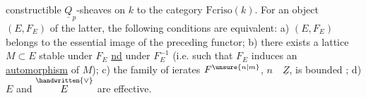 
constructible $\underline{Q}_p$-sheaves on $k$ to the category $\mathrm{Fcriso}(k)$. For an object $(E,F_E)$ of the latter, the following conditions are equivalent: a) $(E,F_E)$ belongs to the essential image of the preceding functor; b) there exists a lattice $M\subset E$ stable under $F_E$  \uline{nd} under $F_E^{-1}$ (i.e. such that $F_E$ induces an \uline{automorphism} of $M$); c) the family of ierates $F^{\unsure{n|m}}$, $n\quad\underline{Z}$, is bounded ; d) $E$ and $\overset{\handwritten{\vee}}{E}$ are effective.

